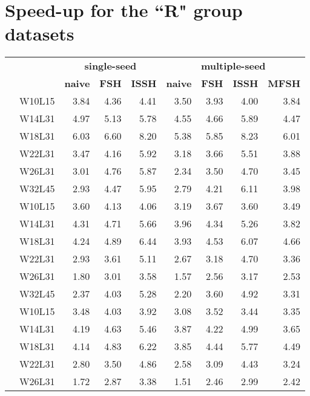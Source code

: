 \section{Speed-up for the “R" group datasets}
\begin{table}[!ht]
	\raggedleft
	\begin{tabular}{c r | rrr | rrrr}
		& & \multicolumn{3}{|c}{\textbf{single-seed}} & \multicolumn{4}{|c}{\textbf{multiple-seed}} \\
		& & \textbf{naive} & \textbf{FSH} & \textbf{ISSH} & \textbf{naive} & \textbf{FSH} & \textbf{ISSH} & \textbf{MFSH} \\
		\toprule
		\multirow{6}{*}{\rotatebox[origin=c]{90}{\textbf{R80}}}
		& W10L15 & 3.84 & 4.36 & 4.41 & 3.50 & 3.93 & 4.00 & 3.84 \\
		& W14L31 & 4.97 & 5.13 & 5.78 & 4.55 & 4.66 & 5.89 & 4.47 \\
		& W18L31 & 6.03 & 6.60 & 8.20 & 5.38 & 5.85 & 8.23 & 6.01 \\
		& W22L31 & 3.47 & 4.16 & 5.92 & 3.18 & 3.66 & 5.51 & 3.88 \\
		& W26L31 & 3.01 & 4.76 & 5.87 & 2.34 & 3.50 & 4.70 & 3.45 \\
		& W32L45 & 2.93 & 4.47 & 5.95 & 2.79 & 4.21 & 6.11 & 3.98 \\
		\midrule
		\multirow{6}{*}{\rotatebox[origin=c]{90}{\textbf{R200}}}
		& W10L15 & 3.60 & 4.13 & 4.06 & 3.19 & 3.67 & 3.60 & 3.49 \\
		& W14L31 & 4.31 & 4.71 & 5.66 & 3.96 & 4.34 & 5.26 & 3.82 \\
		& W18L31 & 4.24 & 4.89 & 6.44 & 3.93 & 4.53 & 6.07 & 4.66 \\
		& W22L31 & 2.93 & 3.61 & 5.11 & 2.67 & 3.18 & 4.70 & 3.36 \\
		& W26L31 & 1.80 & 3.01 & 3.58 & 1.57 & 2.56 & 3.17 & 2.53 \\
		& W32L45 & 2.37 & 4.03 & 5.28 & 2.20 & 3.60 & 4.92 & 3.31 \\
		\midrule
		\multirow{6}{*}{\rotatebox[origin=c]{90}{\textbf{R350}}}
		& W10L15 & 3.48 & 4.03 & 3.92 & 3.08 & 3.52 & 3.44 & 3.35 \\
		& W14L31 & 4.19 & 4.63 & 5.46 & 3.87 & 4.22 & 4.99 & 3.65 \\
		& W18L31 & 4.14 & 4.83 & 6.22 & 3.85 & 4.44 & 5.77 & 4.49 \\
		& W22L31 & 2.80 & 3.50 & 4.86 & 2.58 & 3.09 & 4.43 & 3.24 \\
		& W26L31 & 1.72 & 2.87 & 3.38 & 1.51 & 2.46 & 2.99 & 2.42 \\

\end{tabular}
\end{table}

